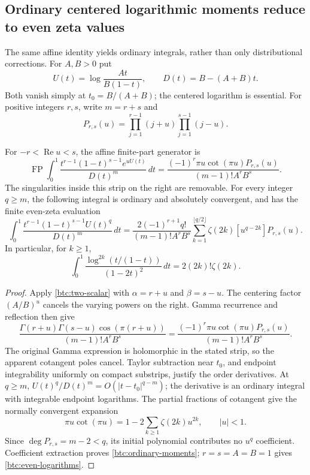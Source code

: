 \subsection{Ordinary centered logarithmic moments reduce to even zeta values}
The same affine identity yields ordinary integrals, rather than only
distributional corrections. For $A,B>0$ put
\[
 U(t)=\log\frac{At}{B(1-t)},\qquad D(t)=B-(A+B)t.
\]
Both vanish simply at $t_0=B/(A+B)$; the centered logarithm is essential.
For positive integers $r,s$, write $m=r+s$ and
\[
 P_{r,s}(u)=\prod_{j=1}^{r-1}(j+u)\prod_{j=1}^{s-1}(j-u).
\]
\begin{theorem}\label{btc:moments}
For $-r<\operatorname{Re}u<s$, the affine finite-part generator is
\begin{equation}\label{btc:moment-generator}
 \operatorname{FP}\int_0^1
 \frac{t^{r-1}(1-t)^{s-1}e^{uU(t)}}{D(t)^m}\,dt
 =\frac{(-1)^r\pi u\cot(\pi u)P_{r,s}(u)}
              {(m-1)!A^rB^s}.
\end{equation}
The singularities inside this strip on the right are removable. For
every integer $q\ge m$, the following integral is ordinary and absolutely
convergent, and has the finite even-zeta evaluation
\begin{equation}\label{btc:ordinary-moments}
 \int_0^1\frac{t^{r-1}(1-t)^{s-1}U(t)^q}{D(t)^m}\,dt
 =\frac{2(-1)^{r+1}q!}{(m-1)!A^rB^s}
       \sum_{k=1}^{\lfloor q/2\rfloor}
          \zeta(2k)[u^{q-2k}]P_{r,s}(u).
\end{equation}
In particular, for $k\ge1$,
\begin{equation}\label{btc:even-logarithms}
 \int_0^1\frac{\log^{2k}(t/(1-t))}{(1-2t)^2}\,dt
                       =2(2k)!\zeta(2k).
\end{equation}
\end{theorem}
\begin{proof}
Apply \eqref{btc:two-scalar} with $\alpha=r+u$ and $\beta=s-u$.
The centering factor $(A/B)^u$ cancels the varying powers on the right.
Gamma recurrence and reflection then give
\[
 \frac{\Gamma(r+u)\Gamma(s-u)\cos(\pi(r+u))}
         {(m-1)!A^rB^s}
 =\frac{(-1)^r\pi u\cot(\pi u)P_{r,s}(u)}{(m-1)!A^rB^s}.
\]
The original Gamma expression is holomorphic in the stated strip, so the
apparent cotangent poles cancel. Taylor subtraction near $t_0$, and
endpoint integrability uniformly on compact substrips, justify the order
derivatives. At $q\ge m$, $U(t)^q/D(t)^m=O(|t-t_0|^{q-m})$;
the derivative is an ordinary integral with integrable endpoint logarithms.
The partial fractions of cotangent give the normally convergent expansion
\[
 \pi u\cot(\pi u)=1-2\sum_{k\ge1}\zeta(2k)u^{2k},\qquad |u|<1.
\]
Since $\deg P_{r,s}=m-2<q$, its initial polynomial contributes no
$u^q$ coefficient. Coefficient extraction proves
\eqref{btc:ordinary-moments}; $r=s=A=B=1$ gives
\eqref{btc:even-logarithms}.
\end{proof}
